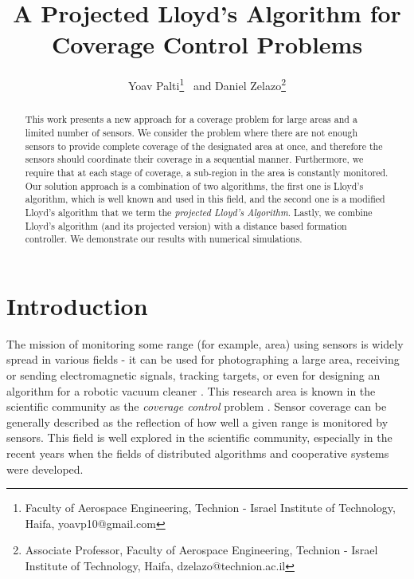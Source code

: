 \documentclass{iacas}
\begin{document}

\title{A Projected Lloyd's Algorithm for Coverage Control Problems}

\author{%
  Yoav Palti\thanks{Faculty of Aerospace Engineering, Technion - Israel Institute of Technology, Haifa, yoavp10@gmail.com}
  \ and
  Daniel Zelazo\thanks{Associate Professor, Faculty of Aerospace Engineering, Technion - Israel Institute of Technology, Haifa, dzelazo@technion.ac.il}
}

\maketitle

\begin{abstract}
This work presents a new approach for a coverage problem for large areas and a limited number of sensors. We consider the problem where there are not enough sensors to provide complete coverage of the designated area at once, and therefore the sensors should coordinate their coverage in a sequential manner.  Furthermore, we require that at each stage of coverage, a sub-region in the area is constantly monitored. Our solution approach is a combination of two algorithms, the first one is Lloyd's algorithm, which is well known and used in this field, and the second one is a modified Lloyd's algorithm that we term the \emph{projected Lloyd's Algorithm}. Lastly, we combine Lloyd's algorithm (and its projected version) with a distance based formation controller. We demonstrate our results with numerical simulations.
\end{abstract}

\section{Introduction}

The mission of monitoring some range (for example, area) using sensors is widely spread in various fields - it can be used for photographing a large area, receiving or sending electromagnetic signals, tracking targets, or even for designing an algorithm for a robotic vacuum cleaner \cite{Nigam2012, 7798796, 7798244}.
%
This research area is known in the scientific community as the \emph{coverage control} problem \cite{Cassandras2005}. Sensor coverage can be generally described as the reflection of how well a given range is monitored by sensors. This field is well explored in the scientific community, especially in the recent years when the fields of distributed algorithms and cooperative systems were developed.
\end{document}
